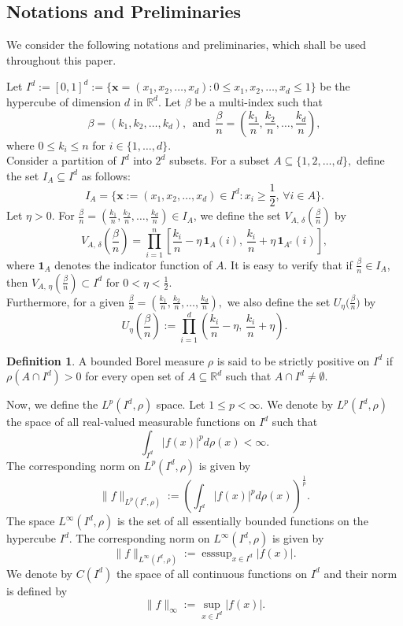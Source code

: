 \documentclass[12pt, reqno]{amsart}
\numberwithin{equation}{section}
\theoremstyle{definition}
\newtheorem{definition}[theorem]{Definition}
\theoremstyle{remark}
\numberwithin{equation}{section}
\newcommand{\R}{\mathbb{R}}
\begin{document}
\subsection{Notations and Preliminaries}
We consider the following notations and preliminaries, which shall be used throughout this paper.

Let $I^d:=[0,1]^d:=\{\mathbf{x}=(x_1,x_2,\ldots,x_d): 0\leq x_1,x_2,\ldots,x_d\leq 1\}$ be the hypercube of dimension $d$ in $\R^d$. 
Let $\beta$ be a multi-index such that
$$\beta=(k_1,k_2,\ldots,k_d), \ \ \mbox{and} \ \ \frac{\beta}{n}=\left(\frac{k_1}{n}, \frac{k_2}{n},\ldots,\frac{k_d}{n}\right),$$ where $0\leq k_i\leq n$ for $i\in \{1,\ldots, d\}.$ \\

Consider a partition of $I^d$ into $2^d$ subsets. For a subset $A\subseteq\{1,2,\ldots,d\},$ define the set $I_A\subseteq I^d$ as follows: $$I_A=\{\mathbf{x}:=(x_1, x_2,\ldots,x_d)\in I^d: x_i\geq\frac{1}{2},\, \forall i\in A \}.$$
Let $\eta>0.$ For $\frac{\beta}{n}=(\frac{k_1}{n},\frac{k_2}{n},\ldots,\frac{k_d}{n})\in I_A$, we define the set $V_{A,\,\delta}(\frac{\beta}{n})$ by
$$V_{A,\,\delta}\left(\frac{\beta}{n}\right)=\prod_{i=1}^n\left[\frac{k_i}{n}-\eta\,\mathbf{1}_{A}(i),\, \frac{k_i}{n}+\eta\,\mathbf{1}_{A^c}(i)\right],$$ where $\mathbf{1}_{A}$ denotes the indicator function of $A.$ It is easy to verify that if $\frac{\beta}{n}\in I_A$, then $V_{A,\,\eta}\left(\frac{\beta}{n}\right)\subset I^d$ for $0<\eta<\frac{1}{2}.$\\

Furthermore, for a given $\frac{\beta}{n}=(\frac{k_1}{n},\frac{k_2}{n},\ldots,\frac{k_d}{n}),$ we also define the set  $U_\eta({\frac{\beta}{n})}$ by
 $$U_\eta\left({\frac{\beta}{n}}\right):=\prod_{i=1}^d\left(\frac{k_i}{n}-\eta,\,\frac{k_i}{n}+\eta\right).$$
 




\begin{definition}
A bounded Borel measure $\rho$ is said to be strictly positive on $I^d$ if 
$\rho(A\cap I^d)>0$
for every open set of $A\subseteq\R^d$ such that $A\cap I^d\neq\emptyset.$ 
\end{definition}

Now, we define the $L^p(I^d,\rho)$ space. Let $1\leq p< \infty$. We denote by $L^p(I^d,\rho)$ the space of all real-valued measurable functions on $I^d$ such that
\begin{equation*}
\int_{I^d}|f(x)|^pd\rho(x)<\infty.
\end{equation*}
The corresponding norm on $L^p(I^d, \rho)$ is given by
$$\|f\|_{L^{p}(I^d,\rho)}:=\left(\int_{I^d}|f(x)|^pd\rho(x)\right)^{\frac{1}{p}}.$$
The space $L^{\infty}(I^d,\rho)$ is the set of all essentially bounded functions on the hypercube $I^d.$ The corresponding norm on $L^{\infty}(I^d,\rho)$ is given by 
$$\|f\|_{L^{\infty}(I^d,\rho)}:=\displaystyle{{\text{ess} \sup}_{x\in I^d}}|f(x)|.$$
We denote by $C(I^d)$ the space of all continuous functions on $I^d$ and their norm is defined by 
$$\|f\|_\infty:=\displaystyle{\sup_{x\in I^d}}|f(x)|.$$
\end{document}
